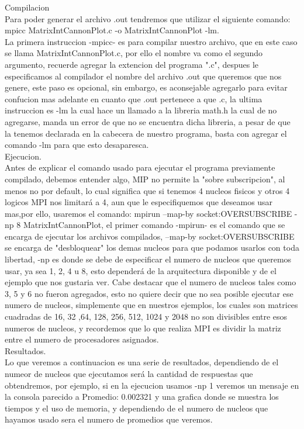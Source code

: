\documentclass[12pt]{article}
\begin{document}
\begin{titlepage}
Compilacion\\
Para poder generar el archivo .out tendremos que utilizar el siguiente comando:
mpicc MatrixIntCannonPlot.c -o MatrixIntCannonPlot -lm.\\
La primera instruccion -mpicc- es para compilar nuestro archivo, que en este caso se llama MatrixIntCannonPlot.c, por ello el nombre va como el segundo argumento, recuerde agregar la extencion del programa ".c", despues le especificamos al compilador el nombre del archivo .out que queremos que nos genere, este paso es opcional, sin embargo, es aconsejable agregarlo para evitar confucion mas adelante en cuanto que .out pertenece a que .c, la ultima instruccion es -lm la cual hace un llamado a la libreria math.h la cual de no agregarse, manda un error de que no se encuentra dicha libreria, a pesar de que la tenemos declarada en la cabecera de nuestro programa, basta con agregar el comando -lm para que esto desaparesca.\\ 

Ejecucion.\\
Antes de explicar el comando usado para ejecutar el programa previamente compilado, debemos entender algo, MIP no permite la "sobre subscripcion", al menos no por default, lo cual significa que si tenemos 4 nucleos fisicos y otros 4 logicos MPI nos limitará a 4, aun que le especifiquemos que deseamos usar mas,por ello, usaremos el comando: mpirun --map-by socket:OVERSUBSCRIBE -np 8 MatrixIntCannonPlot, el primer comando -mpirun- es el comando que se encarga de ejecutar los archivos compilados, --map-by socket:OVERSUBSCRIBE se encarga de "desbloquear" los demas nucleos para que podamos usarlos con toda libertad, -np  es donde se debe de especificar el numero de nucleos que queremos usar, ya sea 1, 2, 4 u 8, esto dependerá de la arquitectura disponible y de el ejemplo que nos gustaria ver. Cabe destacar que el numero de nucleos tales como 3, 5 y 6 no fueron agregados, esto no quiere decir que no sea posible ejecutar ese numero de nucleos, simplemente que en nuestros ejemplos, los cuales son matrices cuadradas de 16, 32 ,64, 128, 256, 512, 1024 y 2048 no son divisibles entre esos numeros de nucleos, y recordemos que lo que realiza MPI es dividir la matriz entre el numero de procesadores asignados. \\

Resultados.\\
Lo que veremos a continuacion es una serie de resultados, dependiendo de el numeor de nucleos que ejecutamos será la cantidad de respuestas que obtendremos, por ejemplo, si en la ejecucion usamos -np 1 veremos un mensaje en la consola parecido a Promedio: 0.002321 y una grafica donde se muestra los tiempos y el uso de memoria, y dependiendo de el numero de nucleos que hayamos usado sera el numero de promedios que veremos.





\end{titlepage}
\end{document}
